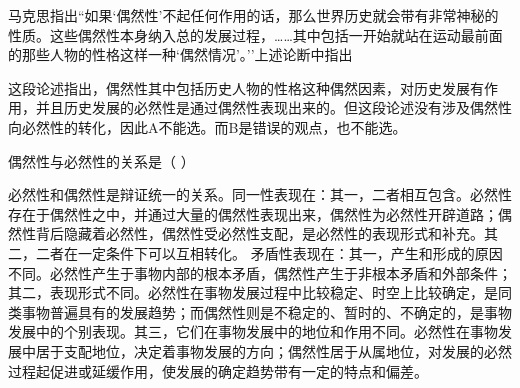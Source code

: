 \question 马克思指出``如果`偶然性'不起任何作用的话，那么世界历史就会带有非常神秘的性质。这些偶然性本身纳入总的发展过程，\ldots{}\ldots{}其中包括一开始就站在运动最前面的那些人物的性格这样一种`偶然情况'。''上述论断中指出
\par{}
\begin{solution}这段论述指出，偶然性其中包括历史人物的性格这种偶然因素，对历史发展有作用，并且历史发展的必然性是通过偶然性表现出来的。但这段论述没有涉及偶然性向必然性的转化，因此A不能选。而B是错误的观点，也不能选。
\end{solution}
\question 偶然性与必然性的关系是（ ）
\par\twoch{\textcolor{red}{偶然性中包含着必然性}}{\textcolor{red}{必然性制约着偶然性}}{\textcolor{red}{偶然性表现必然性，是必然性的补充}}{\textcolor{red}{必然性通过偶然性为自己发展开辟道路}}
\begin{solution}必然性和偶然性是辩证统一的关系。同一性表现在：其一，二者相互包含。必然性存在于偶然性之中，并通过大量的偶然性表现出来，偶然性为必然性开辟道路；偶然性背后隐藏着必然性，偶然性受必然性支配，是必然性的表现形式和补充。其二，二者在一定条件下可以互相转化。
矛盾性表现在：其一，产生和形成的原因不同。必然性产生于事物内部的根本矛盾，偶然性产生于非根本矛盾和外部条件；其二，表现形式不同。必然性在事物发展过程中比较稳定、时空上比较确定，是同类事物普遍具有的发展趋势；而偶然性则是不稳定的、暂时的、不确定的，是事物发展中的个别表现。其三，它们在事物发展中的地位和作用不同。必然性在事物发展中居于支配地位，决定着事物发展的方向；偶然性居于从属地位，对发展的必然过程起促进或延缓作用，使发展的确定趋势带有一定的特点和偏差。
\end{solution}
